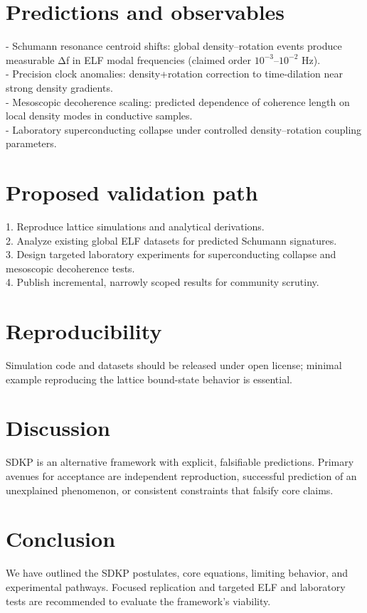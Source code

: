 \documentclass[10pt,twocolumn]{article}
\begin{document}
\section*{Predictions and observables}
- Schumann resonance centroid shifts: global density–rotation events produce measurable Δf in ELF modal frequencies (claimed order $10^{-3}$–$10^{-2}$ Hz).\\
- Precision clock anomalies: density+rotation correction to time-dilation near strong density gradients.\\
- Mesoscopic decoherence scaling: predicted dependence of coherence length on local density modes in conductive samples.\\
- Laboratory superconducting collapse under controlled density–rotation coupling parameters.

\section*{Proposed validation path}
1. Reproduce lattice simulations and analytical derivations.\\
2. Analyze existing global ELF datasets for predicted Schumann signatures.\\
3. Design targeted laboratory experiments for superconducting collapse and mesoscopic decoherence tests.\\
4. Publish incremental, narrowly scoped results for community scrutiny.

\section*{Reproducibility}
Simulation code and datasets should be released under open license; minimal example reproducing the lattice bound-state behavior is essential.

\section*{Discussion}
SDKP is an alternative framework with explicit, falsifiable predictions. Primary avenues for acceptance are independent reproduction, successful prediction of an unexplained phenomenon, or consistent constraints that falsify core claims.

\section*{Conclusion}
We have outlined the SDKP postulates, core equations, limiting behavior, and experimental pathways. Focused replication and targeted ELF and laboratory tests are recommended to evaluate the framework's viability.
\end{document}
